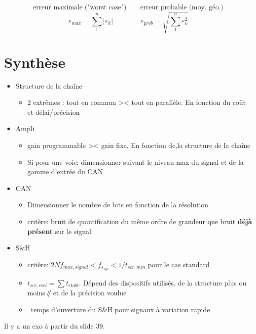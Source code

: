\[\text{erreur maximale ("worst case")}\qquad\text{erreur probable (moy. géo.)}\]
\[\varepsilon_{max}=\sum_1^n|\varepsilon_k|\qquad\qquad\varepsilon_{prob}=\sqrt{\sum_1^n\varepsilon_k^2}\]
\section{Synthèse}
\begin{itemize}
	\item Structure de la chaîne
	\begin{itemize}
		\item 2 extrêmes : tout en commun >< tout en parallèle. En fonction du coût et délai/précision
	\end{itemize}
	\item Ampli
	\begin{itemize}
		\item gain programmable >< gain fixe. En fonction de,la structure de la chaîne
		\item Si pour une voie: dimensionner suivant le niveau max du signal et de la gamme d'entrée du CAN
	\end{itemize}
	\item CAN
	\begin{itemize}
		\item Dimensionner le nombre de bits en fonction de la résolution
		\item critère: bruit de quantification du même ordre de grandeur que bruit \textbf{déjà présent} sur le signal
	\end{itemize}
	\item S\&H
	\begin{itemize}
		\item critère: \(2Nf_{max,signal}<f_{s_{sys}}<1/t_{scr,min}\) pour le cas standard
		\item \(t_{scr,reel}=\sum t_{etabl}\). Dépend des dispositifs utilisés, de la structure plus ou moins \(\mathbin{\!/\mkern-5mu/\!}\) et de la précision voulue
		\item \danger\ temps d'ouverture du S\&H pour signaux à variation rapide
	\end{itemize}
\end{itemize}
Il y a un exo à partir du slide 39.